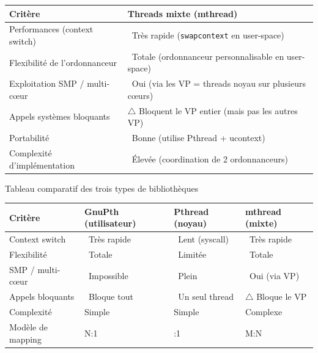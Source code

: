 \documentclass[11pt,a4paper]{article}
\newcommand{\cmark}{\ding{51}}
\newcommand{\xmark}{\ding{55}}
\let\oldtexttt\texttt
\renewcommand{\texttt}[1]{\oldtexttt{\color{keyword}#1}}
\begin{document}
\begin{center}
\begin{tabular}{|l|l|}
\hline
\textbf{Critère} & \textbf{Threads mixte (mthread)} \\
\hline
Performances (context switch) & \cmark\ Très rapide (\texttt{swapcontext} en user-space) \\
\hline
Flexibilité de l'ordonnanceur & \cmark\ Totale (ordonnanceur personnalisable en user-space) \\
\hline
Exploitation SMP / multi-cœur & \cmark\ Oui (via les VP = threads noyau sur plusieurs cœurs) \\
\hline
Appels systèmes bloquants & $\triangle$ Bloquent le VP entier (mais pas les autres VP) \\
\hline
Portabilité & \cmark\ Bonne (utilise Pthread + ucontext) \\
\hline
Complexité d'implémentation & \xmark\ Élevée (coordination de 2 ordonnanceurs) \\
\hline
\end{tabular}
\end{center}

\bigskip

{Tableau comparatif des trois types de bibliothèques}

\begin{center}
\renewcommand{\arraystretch}{1.2}
\setlength{\tabcolsep}{4pt}
\small
\begin{tabularx}{\textwidth}{|>{\raggedright\arraybackslash}p{2.8cm}|>{\raggedright\arraybackslash}X|>{\raggedright\arraybackslash}X|>{\raggedright\arraybackslash}X|}
\hline
\textbf{Critère} & \textbf{GnuPth (utilisateur)} & \textbf{Pthread (noyau)} & \textbf{mthread (mixte)} \\
\hline
Context switch & \cmark\ Très rapide & \xmark\ Lent (syscall) & \cmark\ Très rapide \\
\hline
Flexibilité & \cmark\ Totale & \xmark\ Limitée & \cmark\ Totale \\
\hline
SMP / multi-cœur & \xmark\ Impossible & \cmark\ Plein & \cmark\ Oui (via VP) \\
\hline
Appels bloquants & \xmark\ Bloque tout & \cmark\ Un seul thread & $\triangle$ Bloque le VP \\
\hline
Complexité & Simple & Simple & Complexe \\
\hline
Modèle de mapping & N:1 & 1:1 & M:N \\
\hline
\end{tabularx}
\end{center}
\end{document}
